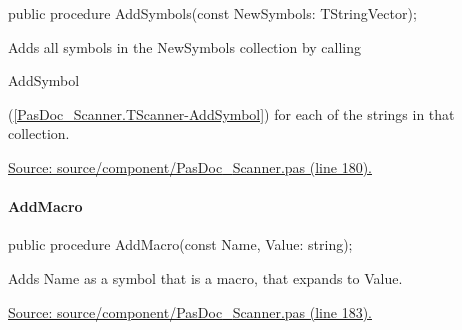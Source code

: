 \documentclass{report}
\newif\ifpdf
\begin{document}
\label{PasDoc_Scanner.TScanner-AddSymbols}
\begin{list}{}{
\setlength{\itemindent}{0cm}
\setlength{\listparindent}{0cm}
\setlength{\leftmargin}{\evensidemargin}
\addtolength{\leftmargin}{\tmplength}
\settowidth{\labelsep}{X}
\addtolength{\leftmargin}{\labelsep}
\setlength{\labelwidth}{\tmplength}
}
\item[\textbf{Declaration}\hfill]
\ifpdf
\begin{flushleft}
\fi
\begin{ttfamily}
public procedure AddSymbols(const NewSymbols: TStringVector);\end{ttfamily}

\ifpdf
\end{flushleft}
\fi

\par
\item[\textbf{Description}]
Adds all symbols in the NewSymbols collection by calling \begin{ttfamily}AddSymbol\end{ttfamily}(\ref{PasDoc_Scanner.TScanner-AddSymbol}) for each of the strings in that collection.\par
\href{https://github.com/pasdoc/pasdoc/blob/master/source/component/PasDoc_Scanner.pas#L180}{Source: source/component/PasDoc{\_}Scanner.pas (line 180).}

\end{list}
\paragraph*{AddMacro}\hspace*{\fill}

\label{PasDoc_Scanner.TScanner-AddMacro}
\begin{list}{}{
\setlength{\itemindent}{0cm}
\setlength{\listparindent}{0cm}
\setlength{\leftmargin}{\evensidemargin}
\addtolength{\leftmargin}{\tmplength}
\settowidth{\labelsep}{X}
\addtolength{\leftmargin}{\labelsep}
\setlength{\labelwidth}{\tmplength}
}
\item[\textbf{Declaration}\hfill]
\ifpdf
\begin{flushleft}
\fi
\begin{ttfamily}
public procedure AddMacro(const Name, Value: string);\end{ttfamily}

\ifpdf
\end{flushleft}
\fi

\par
\item[\textbf{Description}]
Adds Name as a symbol that is a macro, that expands to Value.\par
\href{https://github.com/pasdoc/pasdoc/blob/master/source/component/PasDoc_Scanner.pas#L183}{Source: source/component/PasDoc{\_}Scanner.pas (line 183).}

\end{list}
\end{document}
